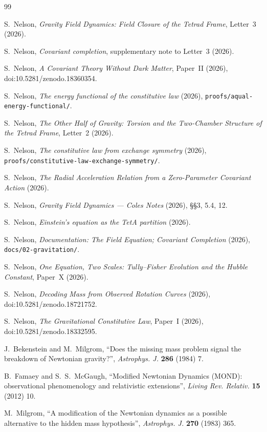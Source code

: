 \documentclass[twocolumn]{iopjournal}
\begin{document}

\begin{thebibliography}{99}

S.~Nelson,
\textit{Gravity Field Dynamics: Field Closure of the Tetrad Frame},
Letter~3 (2026).

S.~Nelson,
\textit{Covariant completion}, supplementary note to Letter~3 (2026).

S.~Nelson,
\textit{A Covariant Theory Without Dark Matter}, Paper~II (2026),
doi:10.5281/zenodo.18360354.

S.~Nelson,
\textit{The energy functional of the constitutive law} (2026),
\texttt{proofs/aqual-energy-functional/}.

S.~Nelson,
\textit{The Other Half of Gravity: Torsion and the Two-Chamber
Structure of the Tetrad Frame}, Letter~2 (2026).

S.~Nelson,
\textit{The constitutive law from exchange symmetry} (2026),
\texttt{proofs/}\linebreak\texttt{constitutive-law-exchange-symmetry/}.

S.~Nelson,
\textit{The Radial Acceleration Relation from a Zero-Parameter
Covariant Action} (2026).

S.~Nelson,
\textit{Gravity Field Dynamics --- Coles Notes} (2026), \S\S3, 5.4, 12.

S.~Nelson,
\textit{Einstein's equation as the TetA partition} (2026).

S.~Nelson,
\textit{Documentation: The Field Equation; Covariant Completion}
(2026), \texttt{docs/02-gravitation/}.

S.~Nelson,
\textit{One Equation, Two Scales: Tully--Fisher Evolution and the
Hubble Constant}, Paper~X (2026).

S.~Nelson,
\textit{Decoding Mass from Observed Rotation Curves} (2026),
doi:10.5281/zenodo.18721752.

S.~Nelson,
\textit{The Gravitational Constitutive Law}, Paper~I (2026),
doi:10.5281/zenodo.18332595.

J.~Bekenstein and M.~Milgrom,
``Does the missing mass problem signal the breakdown of Newtonian
gravity?'', \textit{Astrophys. J.} \textbf{286} (1984) 7.

B.~Famaey and S.~S.~McGaugh,
``Modified Newtonian Dynamics (MOND): observational phenomenology and
relativistic extensions'', \textit{Living Rev. Relativ.} \textbf{15}
(2012) 10.

M.~Milgrom,
``A modification of the Newtonian dynamics as a possible alternative
to the hidden mass hypothesis'', \textit{Astrophys. J.} \textbf{270}
(1983) 365.

\end{thebibliography}
\end{document}
